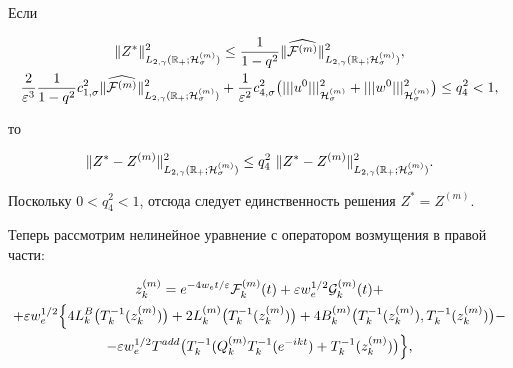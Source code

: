 Если

\begin{gather*}

\|Z^*\|^2_{L_{2,\gamma}(\mathbb R_{+};{\cal H}^{(m)}_\sigma)}\le \frac{1}{1-q^2}

\|\widehat{{\cal F}^{(m)} }  \|^2_{L_{2,\gamma}(\mathbb R_{+};{\cal H}^{(m)}_{\sigma})},

\\

\frac{2}{\varepsilon^3}\frac{1}{1-q^2} c^2_{1,\sigma}

\|\widehat{{\cal F}^{(m)}}  \|^2_{L_{2,\gamma}(\mathbb R_{+};{\cal H}^{(m)}_{\sigma})}+ \frac{1}{\varepsilon^2} c^2_{4,\sigma}\bigl(|||u^0|||^2_{{\cal H}^{(m)}_\sigma}+|||w^0|||^2_{{\cal H}^{(m)}_\sigma}\bigr)\le q_4^2<1,

\end{gather*}

то

$$

\|Z^*-Z^{(m)}\|^2_{L_{2,\gamma}(\mathbb R_{+};{\cal H}^{(m)}_\sigma)}\le q_4^2~\|Z^*-Z^{(m)}\|^2_{L_{2,\gamma}(\mathbb R_{+};{\cal H}^{(m)}_\sigma)}.

$$

Поскольку $0<q_4^2<1$, отсюда следует единственность решения $Z^*=Z^{(m)}$.



\smallskip



 Теперь рассмотрим нелинейное уравнение с оператором возмущения в правой части: 

\begin{multline}

z^{(m)}_k= e^{-4w_e t/\varepsilon} {\cal F}^{(m)}_k(t)

+\varepsilon w_e^{1/2} {\cal G}^{(m)}_k(t)+

\\

+\varepsilon w_e^{1/2}\Bigl\{

4 L_k^B\bigl(T^{-1}_k(z^{(m)}_k)\bigr)+2L^{(m)}_k \bigl(T^{-1}_k(z^{(m)}_k)\bigr)

+4B^{(m)}_k \bigl(T^{-1}_k(z^{(m)}_k), T^{-1}_k(z^{(m)}_k)\bigr)- 

\\

-\varepsilon w_e^{1/2}T^{add}\bigl(T^{-1}_k(Q^{(m)}_k T_k^{-1}(e^{-ikt})+T_k^{-1}(z^{(m)}_k)\bigr)\Bigr\},

\label{duh:0nonoperat}

\end{multline}

